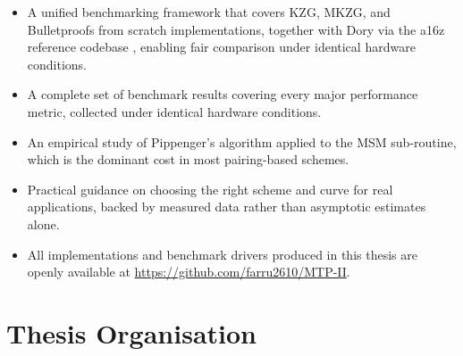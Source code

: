 \begin{itemize}
    \item A unified benchmarking framework that covers KZG, MKZG, and
          Bulletproofs from scratch implementations, together with
          Dory via the a16z reference codebase \cite{a16z_dory},
          enabling fair comparison under identical hardware conditions.
 
    \item A complete set of benchmark results covering every major
          performance metric, collected under identical hardware
          conditions.
 
    \item An empirical study of Pippenger's algorithm applied to the
          MSM sub-routine, which is the dominant cost in most
          pairing-based schemes.
 
    \item Practical guidance on choosing the right scheme and curve
          for real applications, backed by measured data rather than
          asymptotic estimates alone.

    \item All implementations and benchmark drivers produced in this
          thesis are openly available at
          \url{https://github.com/farru2610/MTP-II}.
\end{itemize}
 
\section{Thesis Organisation}

